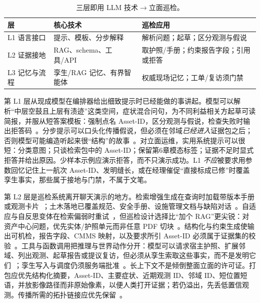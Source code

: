 \begin{table}[htbp]
\centering
\caption{三层即用 LLM 技术$\rightarrow$立面巡检。}
\label{tab:ch8-tech-families}
\begin{tabularx}{\textwidth}{@{}>{\raggedright\arraybackslash}p{2.2cm}>{\raggedright\arraybackslash}p{3.0cm}X@{}}
\toprule
层 & 核心技术 & 巡检应用 \\
\midrule
L1 语言接口 & 提示、模板、分步解释 & 解析问题；起草；区分观测与假说 \\
L2 证据接地 & RAG、schema、工具/API & 取护照/手册；约束报告字段；引用或拒答 \\
L3 记忆与流程 & 孪生/RAG 记忆、有界智能体 & 权威现场记忆；工单/复访须门禁 \\
\bottomrule
\end{tabularx}
\end{table}

第 L1 层从现成模型在编排器给出细致提示时已经能做的事讲起。模型可以解析``中层空鼓且上层有渍迹''这类空间，症状混合问句，为不同利益相关方起草可读简报，并服从短答案模板：强制点名 Asset-ID，区分观测与假说，检查失败时输出拒答码~\cite{ouyang2022instructgpt,ji2023}。分步提示可以口头化传播假说，但必须在邻域\emph{已经进入}证据包之后；否则模型可能编造听起来很``结构''的故事~\cite{wei2022cot,ji2023}。对立面运维，实用系统提示可以很短：分类意图；只谈检索包中的 Asset-ID；保留第6章模态标签；证据不足时显式拒答并给出原因。少样本示例应演示拒答，而不只演示成功。L1 \emph{不应}被要求用参数回忆记住上一航次 Asset-ID、发明缝长，或在经理催促``直接标成已修''时覆盖孪生事实，那些属于接地与门禁，不属于文笔。

第 L2 层是巡检系统离开聊天演示的地方。检索增强生成在查询时加载带版本手册或观测卡片~\cite{lewis2020,shuster2021}；土木落地已覆盖规范、安全手册、设施管理文档与缺陷对话~\cite{joffe2025buildingcodes,lee2024ragsafety,krutli2025fmrags,jeon2025hybridrag,he2025regulationhybrid}。自适应与自反思变体在检索偏弱时重试~\cite{gao2023hyde,asai2024selfrag,jeong2024adaptive}，但巡检设计选择比``加个 RAG''更尖锐：对资产中心问题，优先实体/护照单元而非任意 PDF 切块~\cite{peng2024}。结构化与约束生成使输出可机检，报告字段、CMMS 映射，以及要求所引 Asset-ID 必须属于证据集的校验~\cite{pan2024b,chen2024bimllmontology,iversen2026,buga2025llmfmsql}。工具与函数调用把推理与世界动作分开：模型可以请求宿主护照、扩展邻域、列出观测、起草报告或提议复访，但必须从孪生索取这些事实，而不是发明它们~\cite{schick2023toolformer,yao2023react,guo2025bimllmquery,liu2025bimcoder,li2025b,li2025c}；孪生写入与调度仍须服务端批准~\cite{luo2025llmdtrobot,gao2026ifcagent}。长上下文不是倾倒整面立面的许可证。打包应优先结构化摘要，Asset-ID、主要症状、近期观测 ID、邻域 ID、短位置短语，并放影像路径而非原始像素，以便人类打开证据；若仍溢出，先丢低置信观测。传播所需的拓扑链接应优先保留~\cite{lewis2020,asai2024selfrag}。

